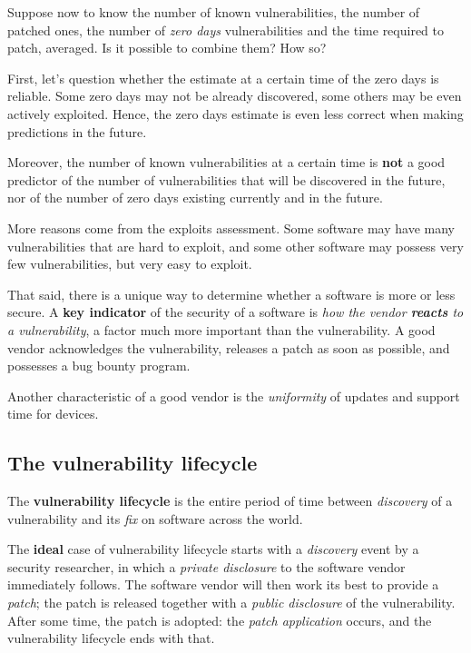 \documentclass[10pt]{extbook}
\begin{document}
Suppose now to know the number of known vulnerabilities, the number of patched
ones, the number of \emph{zero days} vulnerabilities and the time required to
patch, averaged. Is it possible to combine them? How so?

First, let's question whether the estimate at a certain time of the zero days
is reliable. Some zero days may not be already discovered, some others may be
even actively exploited. Hence, the zero days estimate is even less correct
when making predictions in the future.

Moreover, the number of known vulnerabilities at a certain time is \textbf{not}
a good predictor of the number of vulnerabilities that will be discovered in
the future, nor of the number of zero days existing currently and in the
future.

More reasons come from the exploits assessment. Some software may have many
vulnerabilities that are hard to exploit, and some other software may possess
very few vulnerabilities, but very easy to exploit.

That said, there is a unique way to determine whether a software is more or
less secure. A \textbf{key indicator} of the security of a software is
\emph{how the vendor \textbf{reacts} to a vulnerability}, a factor much more
important than the vulnerability. A good vendor acknowledges the vulnerability,
releases a patch as soon as possible, and possesses a bug bounty program.

Another characteristic of a good vendor is the \emph{uniformity} of updates and
support time for devices.


\subsection{The vulnerability lifecycle}

The \textbf{vulnerability lifecycle} is the entire period of time between
\emph{discovery} of a vulnerability and its \emph{fix} on software across the
world.

The \textbf{ideal} case of vulnerability lifecycle starts with a
\emph{discovery} event by a security researcher, in which a \emph{private
disclosure} to the software vendor immediately follows. The software vendor
will then work its best to provide a \emph{patch}; the patch is released
together with a \emph{public disclosure} of the vulnerability. After some time,
the patch is adopted: the \emph{patch application} occurs, and the
vulnerability lifecycle ends with that.
\end{document}
